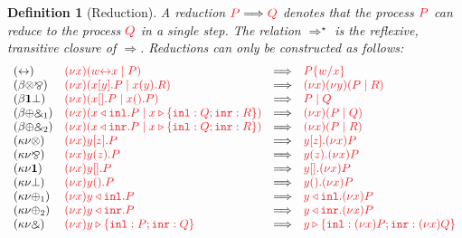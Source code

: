 \documentclass[draft,submission,copyright,creativecommons]{eptcs}
\newtheorem{definition}{Definition}
\begin{document}
\begin{definition}[Reduction]\label{def:hcp-reduction}
  A reduction $\reducesto{P}{Q}$ denotes that the process $\tm{P}$ can reduce
  to the process $\tm{Q}$ in a single step.
  The relation $\Longrightarrow^\star$ is the reflexive, transitive closure of
  $\Longrightarrow$.
  Reductions can only be constructed as follows:
  \[
    \begin{array}{llcll}
      \hccpRedAxCut1
      & \tm{\cpCut{x}{\cpLink{w}{x}}{P}}
      & \Longrightarrow
      & \tm{\cpSub{w}{x}{P}}
      \\
      \hccpRedBetaTensParr
      & \tm{\cpCut{x}{\piBoundSend{x}{y}{P}}{\piRecv{x}{y}{R}}}
      & \Longrightarrow
      & \tm{\piNew{x}{\piNew{y}{(\piPar{P}{R})}}}
      \\
      \hccpRedBetaOneBot
      & \tm{\cpCut{x}{\piBoundSend{x}{}{P}}{\piRecv{x}{}{P}}}
      & \Longrightarrow
      & \tm{\piPar{P}{Q}}
      \\
      \hccpRedBetaPlusWith1
      & \tm{\cpCut{x}{\cpInl{x}{P}}{\cpCase{x}{Q}{R}}}
      & \Longrightarrow
      & \tm{\cpCut{x}{P}{Q}}
      \\
      \hccpRedBetaPlusWith2
      & \tm{\cpCut{x}{\cpInr{x}{P}}{\cpCase{x}{Q}{R}}}
      & \Longrightarrow
      & \tm{\cpCut{x}{P}{R}}
      \\
      \hccpRedKappaNuTens
      & \tm{\piNew{x}{\piBoundSend{y}{z}{P}}}
      & \Longrightarrow
      & \tm{\piBoundSend{y}{z}{\piNew{x}{P}}}
      \\
      \hccpRedKappaNuParr
      & \tm{\piNew{x}{\piRecv{y}{z}{P}}}
      & \Longrightarrow
      & \tm{\piRecv{y}{z}{\piNew{x}{P}}}
      \\
      \hccpRedKappaNuOne
      & \tm{\piNew{x}{\piBoundSend{y}{}{P}}}
      & \Longrightarrow
      & \tm{\piBoundSend{y}{}{\piNew{x}{P}}}
      \\
      \hccpRedKappaNuBot
      & \tm{\piNew{x}{\piRecv{y}{}{P}}}
      & \Longrightarrow
      & \tm{\piRecv{y}{}{\piNew{x}{P}}}
      \\
      \hccpRedKappaNuPlus1
      & \tm{\piNew{x}{\cpInl{y}{P}}}
      & \Longrightarrow
      & \tm{\cpInl{y}{\piNew{x}{P}}}
      \\
      \hccpRedKappaNuPlus2
      & \tm{\piNew{x}{\cpInr{y}{P}}}
      & \Longrightarrow
      & \tm{\cpInr{y}{\piNew{x}{P}}}
      \\
      \hccpRedKappaNuWith
      & \tm{\piNew{x}{\cpCase{y}{P}{Q}}}
      & \Longrightarrow
      & \tm{\cpCase{y}{\piNew{x}{P}}{\piNew{x}{Q}}}
      \\

\end{array}\]
\end{definition}
\end{document}
